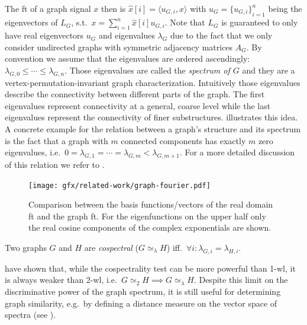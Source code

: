 The \ac{ft} of a graph signal $x$ then is $\hat{x}[i] = \langle u_{G,i}, x \rangle$ with $u_G = {\{ u_{G,i} \}}_{i=1}^{n}$ being the eigenvectors of $L_G$, s.t.\ $x = \sum_{i=1}^n \hat{x}[i] u_{G,i}$.
Note that $L_G$ is guaranteed to only have real eigenvectors $u_G$ and eigenvalues $\lambda_G$ due to the fact that we only consider undirected graphs with symmetric adjacency matrices $A_G$.
By convention we assume that the eigenvalues are ordered ascendingly: $\lambda_{G,0} \leq \cdots \leq \lambda_{G,n}$.
Those eigenvalues are called the \textit{spectrum of $G$} and they are a vertex-permutation-invariant graph characterization.
Intuitively those eigenvalues describe the connectivity between different parts of the graph.
The first eigenvalues represent connectivity at a general, coarse level while the last eigenvalues represent the connectivity of finer substructures.
 illustrates this idea.
A concrete example for the relation between a graph's structure and its spectrum is the fact that a graph with $m$ connected components has exactly $m$ zero eigenvalues, i.e.\ $0 = \lambda_{G,1} = \cdots = \lambda_{G,m} < \lambda_{G,m+1}$.
For a more detailed discussion of this relation we refer to \citet{Das2004}.
\begin{figure}[ht]
	\centering
	\texttt{[image: gfx/related-work/graph-fourier.pdf]}
	\caption[Comparison between the basis vectors of the real domain \acl{ft} and the graph \acl{ft}.]{
		Comparison between the basis functions/vectors of the real domain \ac{ft} and the graph \ac{ft}.
		For the eigenfunctions on the upper half only the real cosine components of the complex exponentials are shown.
	}\label{fig:related:graph-fourier}
\end{figure}
\begin{defn}
	Two graphs $G$ and $H$ are \textit{cospectral} ($G \mathrel{\simeq_\lambda} H$) iff.\ $\forall i: \lambda_{G,i} = \lambda_{H,i}$.
\end{defn}
\citet{Alzaga2010} have shown that, while the cospectrality test can be more powerful than 1-\acs{wl}, it is always weaker than 2-\acs{wl}, i.e.\ $G \mathrel{\simeq_2} H \implies G \mathrel{\simeq_\lambda} H$.
Despite this limit on the discriminative power of the graph spectrum, it is still useful for determining graph similarity, e.g.\ by defining a distance measure on the vector space of spectra (see \citet{Gu2015}).

